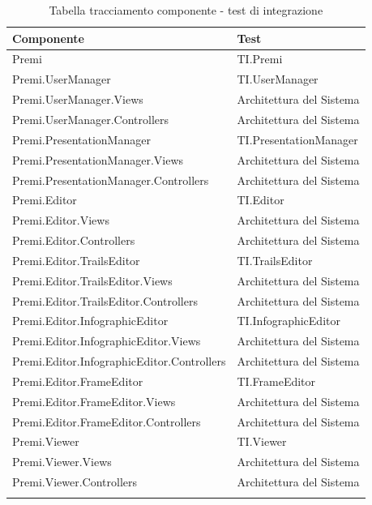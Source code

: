 \begin{longtable}{|l|l|}
	\hline
	\textbf{Componente} & \textbf{Test} \\
	\hline
	Premi & TI.Premi \\
	\hline
	Premi.UserManager & TI.UserManager \\
	\hline
	Premi.UserManager.Views & Architettura del Sistema \\
	\hline
	Premi.UserManager.Controllers & Architettura del Sistema \\
	\hline
	Premi.PresentationManager & TI.PresentationManager \\
	\hline
	Premi.PresentationManager.Views & Architettura del Sistema \\
	\hline
	Premi.PresentationManager.Controllers & Architettura del Sistema \\
	\hline
    Premi.Editor & TI.Editor \\
    \hline
	Premi.Editor.Views & Architettura del Sistema \\
	\hline
	Premi.Editor.Controllers & Architettura del Sistema \\
	\hline
	Premi.Editor.TrailsEditor & TI.TrailsEditor \\
	\hline
	Premi.Editor.TrailsEditor.Views & Architettura del Sistema \\
    \hline
    Premi.Editor.TrailsEditor.Controllers & Architettura del Sistema \\
	\hline
	Premi.Editor.InfographicEditor & TI.InfographicEditor\\
    \hline
    Premi.Editor.InfographicEditor.Views & Architettura del Sistema \\
    \hline
    Premi.Editor.InfographicEditor.Controllers & Architettura del Sistema \\
   	\hline
   	Premi.Editor.FrameEditor & TI.FrameEditor\\
   	\hline
   	Premi.Editor.FrameEditor.Views & Architettura del Sistema \\
   	\hline
   	Premi.Editor.FrameEditor.Controllers & Architettura del Sistema \\
   	\hline
   	Premi.Viewer & TI.Viewer\\
   	\hline
   	Premi.Viewer.Views & Architettura del Sistema \\
   	\hline
   	Premi.Viewer.Controllers & Architettura del Sistema \\
    \hline
	\caption{Tabella tracciamento componente - test di integrazione}
\end{longtable}

